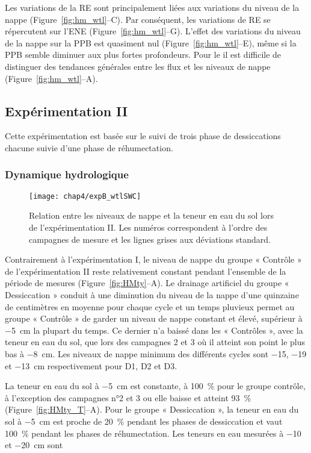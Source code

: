 Les variations de la RE sont principalement liées aux variations du niveau de la nappe (Figure~\ref{fig:hm_wtl}--C).
Par conséquent, les variations de RE se répercutent sur l'ENE (Figure~\ref{fig:hm_wtl}--G).
L'effet des variations du niveau de la nappe sur la PPB est quasiment nul (Figure~\ref{fig:hm_wtl}--E), même si la PPB semble diminuer aux plus fortes profondeurs.
Pour le \chh il est difficile de distinguer des tendances générales entre les flux et les niveaux de nappe (Figure~\ref{fig:hm_wtl}--A).

\subsection{Expérimentation II}

Cette expérimentation est basée sur le suivi de trois phase de dessiccations chacune suivie d'une phase de réhumectation.

\subsubsection{Dynamique hydrologique}

\begin{figure}
\centering
\texttt{[image: chap4/expB\_wtlSWC]}
\caption{Relation entre les niveaux de nappe et la teneur en eau du sol lors de l'expérimentation II. Les numéros correspondent à l'ordre des campagnes de mesure et les lignes grises aux déviations standard.}
\label{fig:wtlSWC_B}
\end{figure}

Contrairement à l'expérimentation I, le niveau de nappe du groupe « Contrôle » de l'expérimentation II reste relativement constant pendant l'ensemble de la période de mesures (Figure~\ref{fig:HMty}--A).
Le drainage artificiel du groupe « Dessiccation » conduit à une diminution du niveau de la nappe d'une quinzaine de centimètres en moyenne pour chaque cycle et un temps pluvieux permet au groupe « Contrôle » de garder un niveau de nappe constant et élevé, supérieur à \SI{-5}{\centi\metre} la plupart du temps.
Ce dernier n'a baissé dans les « Contrôles », avec la teneur en eau du sol, que lors des campagnes 2 et 3 où il atteint son point le plus bas à \SI{-8}{\centi\metre}.
Les niveaux de nappe minimum des différents cycles sont \num{-15}, \num{-19} et \SI{-13}{\centi\metre} respectivement pour D1, D2 et D3.

La teneur en eau du sol à \SI{-5}{\centi\metre} est constante, à \SI{100}{\percent} pour le groupe contrôle, à l'exception des campagnes n°2 et 3 ou elle baisse et atteint \SI{93}{\percent} (Figure~\ref{fig:HMty_T}--A).
Pour le groupe « Dessiccation », la teneur en eau du sol à \SI{-5}{\centi\metre} est proche de \SI{20}{\percent} pendant les phases de dessiccation et vaut \SI{100}{\percent} pendant les phases de réhumectation.
Les teneurs en eau mesurées à \num{-10} et \SI{-20}{\centi\metre} sont

